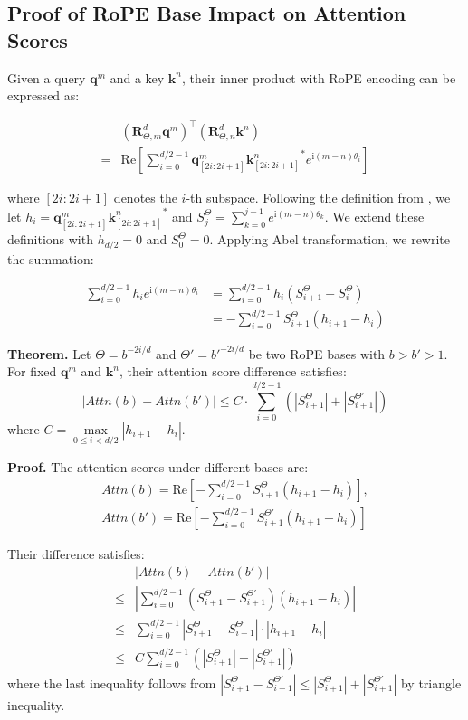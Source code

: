 \subsection{Proof of RoPE Base Impact on Attention Scores}
Given a query $\mathbf{q}^m$ and a key $\mathbf{k}^n$, their inner product with RoPE encoding can be expressed as:

\begin{align}
   & (\mathbf{R}^d_{\Theta, m} \mathbf{q}^m)^\top (\mathbf{R}^d_{\Theta, n} \mathbf{k}^n)\\ =& \mathrm{Re}\left[\sum_{i=0}^{d/2-1} \mathbf{q}^m_{[2i:2i+1]} {\mathbf{k}^n_{[2i:2i+1]}}^* e^{\mathrm{i}(m-n)\theta_i}\right]
\end{align}


where $[2i:2i+1]$ denotes the $i$-th subspace. Following the definition from \citet{su-neurocomputing-2024-roformer}, we let $h_i = \mathbf{q}^m_{[2i:2i+1]} {\mathbf{k}^n_{[2i:2i+1]}}^*$ and $S^\Theta_j = \sum_{k=0}^{j-1} e^{\mathrm{i}(m-n)\theta_k}$. We extend these definitions with $h_{d/2} = 0$ and $S^\Theta_0 = 0$. Applying Abel transformation, we rewrite the summation:

\begin{align}
\sum_{i=0}^{d/2-1} h_i e^{\mathrm{i}(m-n)\theta_i} 
&= \sum_{i=0}^{d/2-1} h_i (S^\Theta_{i+1} - S^\Theta_i) \\
&= -\sum_{i=0}^{d/2-1} S^\Theta_{i+1}(h_{i+1} - h_i)
\end{align}

\textbf{Theorem.} Let $\Theta = b^{-2i/d}$ and $\Theta' = {b'}^{-2i/d}$ be two RoPE bases with $b > b' > 1$. For fixed $\mathbf{q}^m$ and $\mathbf{k}^n$, their attention score difference satisfies:
\[
\left| \textit{Attn}(b) - \textit{Attn}(b') \right| \leq C \cdot \sum_{i=0}^{d/2-1} \left(|S^{\Theta}_{i+1}| + |S^{\Theta'}_{i+1}|\right)
\]
where $C = \max\limits_{0 \leq i < d/2} |h_{i+1} - h_i|$.

\textbf{Proof.}  
The attention scores under different bases are:
\begin{align}
    \textit{Attn}(b) = \mathrm{Re}\left[-\sum_{i=0}^{d/2-1} S^\Theta_{i+1}(h_{i+1} - h_i)\right],\\ \textit{Attn}(b') = \mathrm{Re}\left[-\sum_{i=0}^{d/2-1} S^{\Theta'}_{i+1}(h_{i+1} - h_i)\right]
\end{align}

Their difference satisfies:
\begin{align}
&\left| \textit{Attn}(b) - \textit{Attn}(b') \right|\\ 
\leq & \left|\sum_{i=0}^{d/2-1} \left(S^\Theta_{i+1} - S^{\Theta'}_{i+1}\right)(h_{i+1} - h_i)\right| \\
\leq & \sum_{i=0}^{d/2-1} \left| S^\Theta_{i+1} - S^{\Theta'}_{i+1}\right| \cdot \left| h_{i+1} - h_i\right| \\
\leq & C \sum_{i=0}^{d/2-1} \left(|S^{\Theta}_{i+1}| + |S^{\Theta'}_{i+1}|\right)
\end{align}
where the last inequality follows from $|S^\Theta_{i+1} - S^{\Theta'}_{i+1}| \leq |S^\Theta_{i+1}| + |S^{\Theta'}_{i+1}|$ by triangle inequality.

